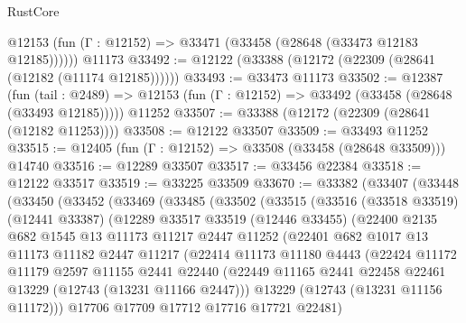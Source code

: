 \begin{lexlean}{RustCore}
\begin{coremodule}
      @12153 (fun (Γ : @12152) => @33471 (@33458 (@28648 (@33473 @12183 @12185))))))
    @11173
@33492 := @12122 (@33388 (@12172 (@22309 (@28641 (@12182 (@11174 @12185))))))
@33493 := @33473 @11173
@33502 := @12387
    (fun (tail : @2489) => @12153 (fun (Γ : @12152) => @33492 (@33458 (@28648 (@33493 @12185)))))
    @11252
@33507 := @33388 (@12172 (@22309 (@28641 (@12182 @11253))))
@33508 := @12122 @33507
@33509 := @33493 @11252
@33515 := @12405 (fun (Γ : @12152) => @33508 (@33458 (@28648 @33509))) @14740
@33516 := @12289 @33507
@33517 := @33456 @22384
@33518 := @12122 @33517
@33519 := @33225 @33509
@33670 := @33382
    (@33407
      (@33448
        (@33450
          (@33452
            (@33469
              (@33485
                (@33502
                  (@33515
                    (@33516
                      (@33518 @33519)
                      (@12441 @33387)
                      (@12289
                        @33517
                        @33519
                        (@12446 @33455)
                        (@22400
                          @2135
                          @682
                          @1545
                          @13
                          @11173
                          @11217
                          @2447
                          @11252
                          (@22401
                            @682
                            @1017
                            @13
                            @11173
                            @11182
                            @2447
                            @11217
                            (@22414
                              @11173
                              @11180
                              @4443
                              (@22424
                                @11172
                                @11179
                                @2597
                                @11155
                                @2441
                                @22440
                                (@22449
                                  @11165
                                  @2441
                                  @22458
                                  @22461
                                  @13229
                                  (@12743 (@13231 @11166 @2447)))
                                @13229
                                (@12743 (@13231 @11156 @11172)))
                              @17706
                              @17709
                              @17712
                              @17716
                              @17721
                              @22481)

\end{coremodule}
\end{lexlean}
